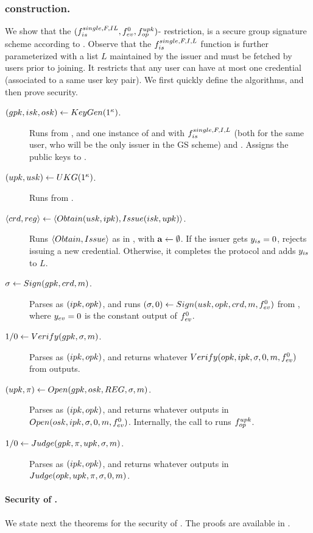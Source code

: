 \subsubsection{\CUASGS construction.} %
We show that the $(f_{is}^{single,F,IL},f_{ev}^0,f_{op}^{upk})$-\CUASGen
restriction, is a secure group signature scheme according to \cite{bsz05}.
Observe that the $f_{is}^{single,F,I,L}$ function is further parameterized with
a list $L$ maintained by the issuer and must be fetched by users prior to
joining. It restricts that any user can have at most one credential (associated
to a same user key pair). We first quickly define the algorithms, and then
prove security.

\begin{description}
\item[$(gpk,isk,osk) \gets KeyGen(1^\kappa)$.] Runs \Setup from \CUASGen,
  and one instance of \KeyGen and \ISet with $f_{is}^{single,F,I,L}$ (both for
  the same user, who will be the only issuer in the GS scheme) and \OKeyGen.
  Assigns the public keys to \gpk.
\item[$(upk,usk) \gets UKG(1^\kappa)$.] Runs \KeyGen from \CUASGen.
\item[$\langle crd,reg \rangle \gets
  \langle Obtain(usk,ipk),Issue(isk,upk)\rangle$.] Runs $\langle Obtain,
  Issue\rangle$ as in \CUASGen, with $\mathbf{a} \gets \emptyset$. If the issuer
  gets $y_{is} = 0$, rejects issuing a new credential. Otherwise, it completes
  the protocol and adds $y_{is}$ to $L$.
\item[$\sigma \gets Sign(gpk,crd,m)$.] Parses \gpk as $(ipk,opk)$, and
  runs $(\sigma,0) \gets Sign(usk,opk,crd,m,f_{ev}^0)$ from \CUASGen,
  where $y_{ev} = 0$ is the constant output of $f_{ev}^0$.
\item[$1/0 \gets Verify(gpk,\sigma,m)$.] Parses \gpk as $(ipk,opk)$, and
  returns whatever $Verify(opk,ipk,\sigma,0,m,f_{ev}^0)$ from \CUASGen
  outputs.
\item[$(\upk,\pi) \gets \Open(\gpk,\osk,\trans,\sig,\msg)$.] Parses \gpk as
  $(ipk,opk)$, and returns whatever \CUASGen outputs in $Open(osk,ipk,\sigma,
  0,m,f_{ev}^0)$. Internally, the call to \Open runs $f_{op}^{upk}$.
\item[$1/0 \gets Judge(gpk,\pi,upk,\sigma,m)$.] Parses \gpk as $(ipk,
  opk)$, and returns whatever \CUASGen outputs in $Judge(opk,upk,\pi,\sigma,
  0,m)$.
\end{description}

\paragraph{Security of \CUASGS.} %
We state next the theorems for the security of \CUASGS. The proofs are available
in .

